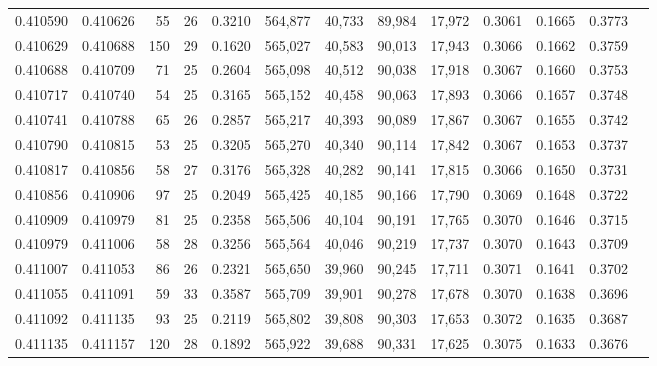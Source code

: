 \begin{tabular}{rrrrrrrrrrrrr}
0.410590 & 0.410626 &    55 &  26 &                                     0.3210 & 564,877 &  40,733 &  89,984 &  17,972 & 0.3061 & 0.1665 & 0.3773 \\
0.410629 & 0.410688 &   150 &  29 &                                     0.1620 & 565,027 &  40,583 &  90,013 &  17,943 & 0.3066 & 0.1662 & 0.3759 \\
0.410688 & 0.410709 &    71 &  25 &                                     0.2604 & 565,098 &  40,512 &  90,038 &  17,918 & 0.3067 & 0.1660 & 0.3753 \\
0.410717 & 0.410740 &    54 &  25 &                                     0.3165 & 565,152 &  40,458 &  90,063 &  17,893 & 0.3066 & 0.1657 & 0.3748 \\
0.410741 & 0.410788 &    65 &  26 &                                     0.2857 & 565,217 &  40,393 &  90,089 &  17,867 & 0.3067 & 0.1655 & 0.3742 \\
0.410790 & 0.410815 &    53 &  25 &                                     0.3205 & 565,270 &  40,340 &  90,114 &  17,842 & 0.3067 & 0.1653 & 0.3737 \\
0.410817 & 0.410856 &    58 &  27 &                                     0.3176 & 565,328 &  40,282 &  90,141 &  17,815 & 0.3066 & 0.1650 & 0.3731 \\
0.410856 & 0.410906 &    97 &  25 &                                     0.2049 & 565,425 &  40,185 &  90,166 &  17,790 & 0.3069 & 0.1648 & 0.3722 \\
0.410909 & 0.410979 &    81 &  25 &                                     0.2358 & 565,506 &  40,104 &  90,191 &  17,765 & 0.3070 & 0.1646 & 0.3715 \\
0.410979 & 0.411006 &    58 &  28 &                                     0.3256 & 565,564 &  40,046 &  90,219 &  17,737 & 0.3070 & 0.1643 & 0.3709 \\
0.411007 & 0.411053 &    86 &  26 &                                     0.2321 & 565,650 &  39,960 &  90,245 &  17,711 & 0.3071 & 0.1641 & 0.3702 \\
0.411055 & 0.411091 &    59 &  33 &                                     0.3587 & 565,709 &  39,901 &  90,278 &  17,678 & 0.3070 & 0.1638 & 0.3696 \\
0.411092 & 0.411135 &    93 &  25 &                                     0.2119 & 565,802 &  39,808 &  90,303 &  17,653 & 0.3072 & 0.1635 & 0.3687 \\
0.411135 & 0.411157 &   120 &  28 &                                     0.1892 & 565,922 &  39,688 &  90,331 &  17,625 & 0.3075 & 0.1633 & 0.3676 \\

\end{tabular}
